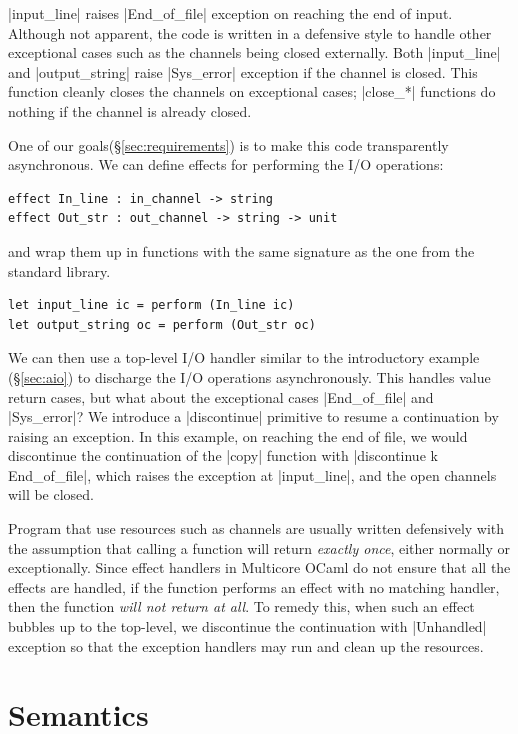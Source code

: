 \documentclass[sigplan,10pt,review,anonymous]{acmart}\settopmatter{printfolios=true,printccs=false,printacmref=false}
\begin{document}
|input_line| raises |End_of_file| exception on reaching the end of input.
Although not apparent, the code is written in a defensive style to handle other
exceptional cases such as the channels being closed externally. Both
|input_line| and |output_string| raise |Sys_error| exception if the channel is
closed. This function cleanly closes the channels on exceptional cases;
|close_*| functions do nothing if the channel is already closed.

One of our goals(\S\ref{sec:requirements}) is to make this code transparently
asynchronous. We can define effects for performing the I/O operations:
\begin{lstlisting}
effect In_line : in_channel -> string
effect Out_str : out_channel -> string -> unit
\end{lstlisting}
\noindent and wrap them up in functions with the same signature as the one from
the standard library.
\begin{lstlisting}
let input_line ic = perform (In_line ic)
let output_string oc = perform (Out_str oc)
\end{lstlisting}

We can then use a top-level I/O handler similar to the introductory example
(\S\ref{sec:aio}) to discharge the I/O operations asynchronously. This handles
value return cases, but what about the exceptional cases |End_of_file| and
|Sys_error|? We introduce a |discontinue| primitive to resume a continuation by
raising an exception. In this example, on reaching the end of file, we would
discontinue the continuation of the |copy| function with |discontinue k End_of_file|,
which raises the exception at |input_line|, and the open channels
will be closed.

Program that use resources such as channels are usually written defensively
with the assumption that calling a function will return \emph{exactly once},
either normally or exceptionally. Since effect handlers in Multicore OCaml do
not ensure that all the effects are handled, if the function performs an effect
with no matching handler, then the function \emph{will not return at all}. To
remedy this, when such an effect bubbles up to the top-level, we discontinue
the continuation with |Unhandled| exception so that the exception handlers may
run and clean up the resources.

\section{Semantics}
\label{sec:semantics}
\end{document}
